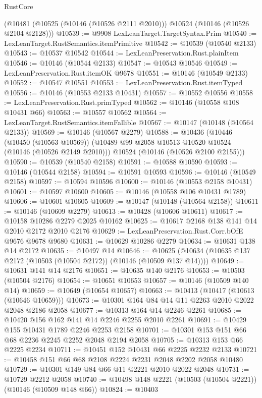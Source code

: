 \begin{lexlean}{RustCore}
\begin{coremodule}
    (@10481 (@10525 (@10146 (@10526 @2111 @2010))) @10524 (@10146 (@10526 @2104 @2128)))
@10539 := @9908 LexLeanTarget.TargetSyntax.Prim
@10540 := LexLeanTarget.RustSemantics.itemPrimitive
@10542 := @10539 (@10540 @2133)
@10543 := @10537 @10542
@10544 := LexLeanPreservation.Rust.plainItem
@10546 := @10146 (@10544 @2133)
@10547 := @10543 @10546
@10549 := LexLeanPreservation.Rust.itemOK @9678
@10551 := @10146 (@10549 @2133)
@10552 := @10547 @10551
@10553 := LexLeanPreservation.Rust.itemTyped
@10556 := @10146 (@10553 @2133 @10431)
@10557 := @10552 @10556
@10558 := LexLeanPreservation.Rust.primTyped
@10562 := @10146 (@10558 @108 @10431 @66)
@10563 := @10557 @10562
@10564 := LexLeanTarget.RustSemantics.itemFallible
@10567 := @10147 (@10148 (@10564 @2133))
@10569 := @10146 (@10567 @2279)
@10588 := @10436
    (@10446
      (@10450 (@10563 @10569))
      (@10489 @99 @2058 @10513 @10520 @10524 (@10146 (@10526 @2149 @2010)))
      @10524
      (@10146 (@10526 @2100 @2155)))
@10590 := @10539 (@10540 @2158)
@10591 := @10588 @10590
@10593 := @10146 (@10544 @2158)
@10594 := @10591 @10593
@10596 := @10146 (@10549 @2158)
@10597 := @10594 @10596
@10600 := @10146 (@10553 @2158 @10431)
@10601 := @10597 @10600
@10605 := @10146 (@10558 @106 @10431 @1789)
@10606 := @10601 @10605
@10609 := @10147 (@10148 (@10564 @2158))
@10611 := @10146 (@10609 @2279)
@10613 := @10428 (@10606 @10611)
@10617 := @10158 @10286 @2279 @2025 @10162
@10625 := @10617 @2168 @138 @141 @14 @2010 @2172 @2010 @2176
@10629 := LexLeanPreservation.Rust.Corr.bOfE @9676 @9678 @9680
@10631 := @10629 @10286 @2279
@10634 := @10631 @138 @14 @2172
@10635 := @10497 @14
@10646 := @10625 (@10634 (@10635 @137 @2172 (@10503 (@10504 @2172)) (@10146 (@10509 @137 @14))))
@10649 := @10631 @141 @14 @2176
@10651 := @10635 @140 @2176
@10653 := @10503 (@10504 @2176)
@10654 := @10651 @10653
@10657 := @10146 (@10509 @140 @14)
@10659 := @10649 (@10654 @10657)
@10663 := @10413 (@10417 (@10613 (@10646 @10659)))
@10673 := @10301 @164 @84 @14 @11 @2263 @2010 @2022 @2048 @2186 @2058
@10677 := @10313 @164 @14 @2246 @2261
@10685 := @10420 @156 @162 @141 @14 @2246 @2255 @2010 @2261
@10691 := @10429 @155 @10431 @1789 @2246 @2253 @2158
@10701 := @10301 @153 @151 @66 @68 @2236 @2245 @2252 @2048 @2194 @2058
@10705 := @10313 @153 @66 @2225 @2234
@10711 := @10451 @152 @10431 @66 @2225 @2232 @2133
@10721 := @10458 @151 @66 @68 @2108 @2224 @2231 @2048 @2202 @2058 @10480
@10729 := @10301 @149 @84 @66 @11 @2221 @2010 @2022 @2048
@10731 := @10729 @2212 @2058
@10740 := @10498 @148 @2221 (@10503 (@10504 @2221)) (@10146 (@10509 @148 @66))
@10824 := @10403

\end{coremodule}
\end{lexlean}
